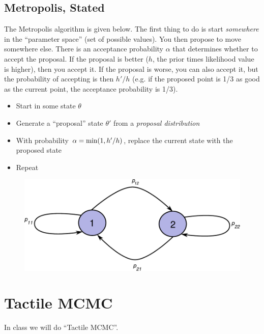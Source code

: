\subsection{Metropolis, Stated}
The Metropolis algorithm is given below. The first thing to do is start
{\it somewhere} in the ``parameter space'' (set of possible values). You then
propose to move somewhere else. There is an acceptance probability $\alpha$
that determines whether to accept the proposal. If the proposal is better
($h$, the prior times likelihood value is higher), then you accept it. If the
proposal is worse, you can also accept it, but the probability of accepting is
then $h'/h$ (e.g. if the proposed point is 1/3 as good as the current point, the
acceptance probability is 1/3).

\begin{framed}
\begin{itemize}
\item Start in some state $\theta$
\item Generate a ``proposal'' state $\theta'$ from a {\it proposal distribution}
\item With probability $\alpha = \textnormal{min}(1, h'/h)$, replace the current
state with the proposed state
\item Repeat
\end{itemize}
\end{framed}



\begin{figure}[ht!]
\begin{center}
\includegraphics[scale=0.65]{Figures/transitions.pdf}
\caption{\label{fig:transitions}}
\end{center}
\end{figure}



\section{Tactile MCMC}
In class we will do ``Tactile MCMC''.

